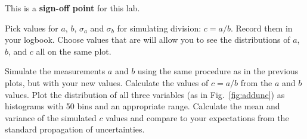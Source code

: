 This is a \textbf{sign-off point} for this lab. 

Pick values for $a$, $b$, $\sigma_a$ and $\sigma_b$ for simulating
division: $c=a/b$. Record them in your logbook.  Choose values that
are will allow you to see the distributions of $a$, $b$, and $c$ all
on the same plot.

\begin{plot}
Simulate the measurements $a$ and $b$ using the same procedure as in the previous plots, but with your new values.  Calculate the values of $c = a/b $ from
the $a$ and $b$ values.  Plot the distribution of all three variables (as in
Fig.~\ref{fig:addunc}) as histograms with 50 bins and an appropriate
range.  Calculate the mean and variance of the simulated $c$ values
and compare to your expectations from the standard propagation of
uncertainties.
\end{plot}






























